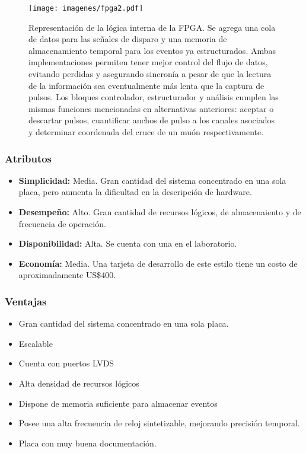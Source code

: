 \begin{figure}[H]
	\centering
	\texttt{[image: imagenes/fpga2.pdf]}
	\caption{Representación de la lógica interna de la FPGA. Se agrega una cola de datos para las señales de disparo y una memoria de almacenamiento temporal para los eventos ya estructurados. Ambas implementaciones permiten tener mejor control del flujo de datos, evitando perdidas y asegurando sincronía a pesar de que la lectura de la información sea eventualmente más lenta que la captura de pulsos. Los bloques controlador, estructurador y análisis cumplen las mismas funciones mencionadas en alternativas anteriores: aceptar o descartar pulsos, cuantificar anchos de pulso a  los canales asociados y determinar coordenada del cruce de un muón respectivamente.}
	\label{fig:fpga2}
\end{figure}

\newpage
\subsubsection*{Atributos}
\begin{itemize}
	\item \textbf{Simplicidad:}  Media. Gran cantidad del sistema concentrado en una sola placa, pero aumenta la dificultad en la descripción de hardware.
	\item \textbf{Desempeño:}  Alto. Gran cantidad de recursos lógicos, de almacenaiento y de frecuencia de operación.
	\item \textbf{Disponibilidad: } Alta. Se cuenta con una en el laboratorio.
	\item \textbf{Economía: } Media. Una tarjeta de desarrollo de este estilo tiene un costo de aproximadamente US\$400.
\end{itemize}

\subsubsection*{Ventajas}
\begin{itemize}
	\item Gran cantidad del sistema concentrado en una sola placa.
	\item Escalable
	\item Cuenta con puertos LVDS
	\item Alta densidad de recursos lógicos
	\item Dispone de memoria suficiente para almacenar eventos
	\item Posee una alta frecuencia de reloj sintetizable, mejorando precisión temporal.
	\item Placa con muy buena documentación.
\end{itemize}


